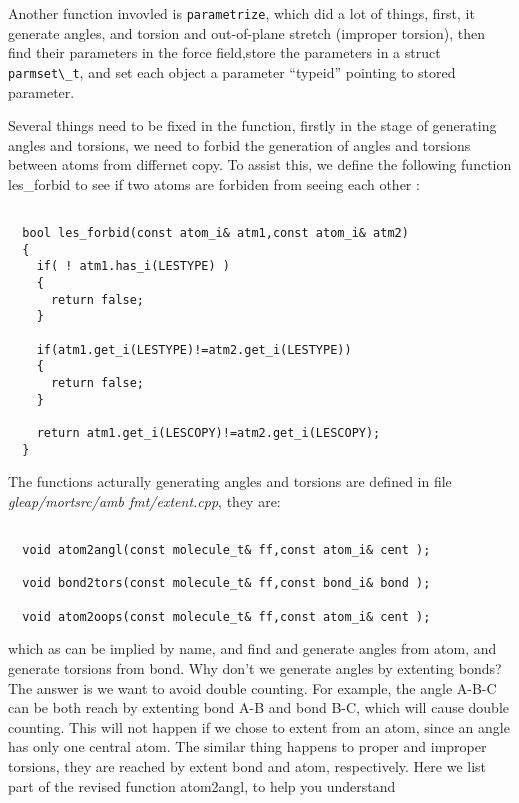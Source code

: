\documentclass[letterpaper]{book}
\begin{document}
Another function invovled is \lstinline$parametrize$, which did a lot of things, first, it generate angles, 
and torsion and out-of-plane stretch (improper torsion), then find their
parameters in the force field,store the parameters in a struct \lstinline$parmset\_t$, and set each object a 
parameter ``typeid'' pointing to stored parameter.

Several things need to be fixed in the function, firstly in the stage of generating angles and 
torsions, we need to forbid the generation of angles and torsions between atoms from differnet 
copy. To assist this, we define the following function les\_forbid to see if two atoms are 
forbiden from seeing each other :
\begin{lstlisting}

  bool les_forbid(const atom_i& atm1,const atom_i& atm2)
  {
    if( ! atm1.has_i(LESTYPE) )
    {
      return false;
    }
            
    if(atm1.get_i(LESTYPE)!=atm2.get_i(LESTYPE))
    {
      return false;
    }
            
    return atm1.get_i(LESCOPY)!=atm2.get_i(LESCOPY);
  }

\end{lstlisting}

The functions acturally generating angles and torsions are defined in file {\it gleap/mortsrc/amb
fmt/extent.cpp},
they are:

\begin{lstlisting}
    
  void atom2angl(const molecule_t& ff,const atom_i& cent );        

  void bond2tors(const molecule_t& ff,const bond_i& bond );

  void atom2oops(const molecule_t& ff,const atom_i& cent );

\end{lstlisting}

  which as can be implied by name, and find and generate angles from atom, and generate torsions
from bond. Why don't we generate angles by extenting bonds? The answer is we want to avoid double
counting. For example, the angle A-B-C can be both reach by extenting bond A-B and bond B-C, 
which will cause double counting. This will not happen if we chose to extent from an atom, since
an angle has only one central atom. The similar thing happens to proper and improper torsions, 
they are reached by extent bond and atom, respectively. Here we list part of the revised function
atom2angl, to help you understand 
\end{document}
